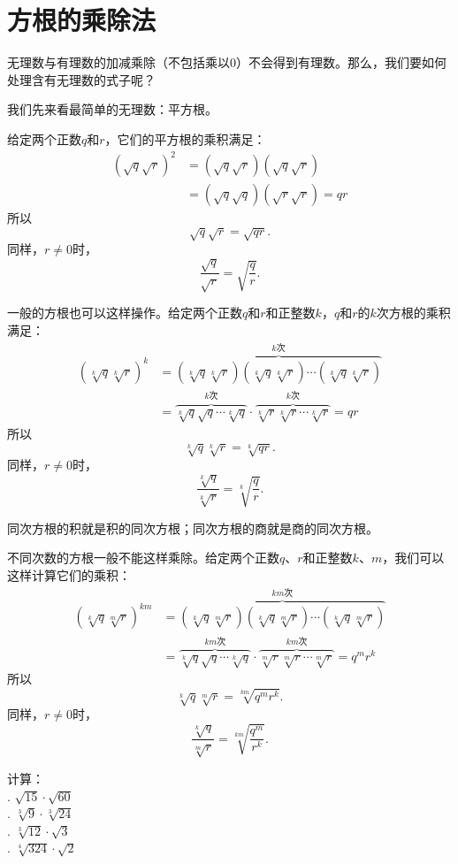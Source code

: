 \documentclass[12pt,UTF8]{ctexbook}
\begin{document}
\section{方根的乘除法}

无理数与有理数的加减乘除（不包括乘以$0$）不会得到有理数。那么，我们要如何处理含有无理数的式子呢？

我们先来看最简单的无理数：平方根。

给定两个正数$q$和$r$，它们的平方根的乘积满足：
\begin{align*}
    \left(\sqrt{q}\sqrt{r}\right)^2 &=  \left(\sqrt{q}\sqrt{r}\right)\left(\sqrt{q}\sqrt{r}\right)  \\
    &= \left(\sqrt{q}\sqrt{q}\right)\left(\sqrt{r}\sqrt{r}\right) = qr  
\end{align*}
所以
$$\sqrt{q}\sqrt{r} = \sqrt{qr}.$$
同样，$r \neq 0$时，
$$\frac{\sqrt{q}}{\sqrt{r}} = \sqrt{\frac{q}{r}}.$$

一般的方根也可以这样操作。给定两个正数$q$和$r$和正整数$k$，$q$和$r$的$k$次方根的乘积满足：
\begin{align*}
    \left(\sqrt[k]{q}\sqrt[k]{r}\right)^k &= \overbrace{\left(\sqrt[k]{q}\sqrt[k]{r}\right)\left(\sqrt[k]{q}\sqrt[k]{r}\right) \cdots \left(\sqrt[k]{q}\sqrt[k]{r}\right)}^{k\mbox{次}}   \\
    &= \overbrace{\sqrt[k]{q}\sqrt{q}\cdots \sqrt[k]{q}}^{k\mbox{次}}\cdot\overbrace{\sqrt[k]{r}\sqrt[k]{r}\cdots \sqrt[k]{r}}^{k\mbox{次}} = qr  
\end{align*}
所以
$$\sqrt[k]{q}\sqrt[k]{r} = \sqrt[k]{qr}.$$
同样，$r \neq 0$时，
$$\frac{\sqrt[k]{q}}{\sqrt[k]{r}} = \sqrt[k]{\frac{q}{r}}.$$

同次方根的积就是积的同次方根；同次方根的商就是商的同次方根。

不同次数的方根一般不能这样乘除。给定两个正数$q$、$r$和正整数$k$、$m$，我们可以这样计算它们的乘积：
\begin{align*}
    \left(\sqrt[k]{q}\sqrt[m]{r}\right)^{km} &= \overbrace{\left(\sqrt[k]{q}\sqrt[m]{r}\right)\left(\sqrt[k]{q}\sqrt[m]{r}\right) \cdots \left(\sqrt[k]{q}\sqrt[m]{r}\right)}^{km\mbox{次}}   \\
    &= \overbrace{\sqrt[k]{q}\sqrt{q}\cdots \sqrt[k]{q}}^{km\mbox{次}}\cdot\overbrace{\sqrt[m]{r}\sqrt[m]{r}\cdots \sqrt[m]{r}}^{km\mbox{次}} = q^mr^k  
\end{align*}
所以
$$\sqrt[k]{q}\sqrt[m]{r} = \sqrt[km]{q^mr^k}.$$
同样，$r \neq 0$时，
$$\frac{\sqrt[k]{q}}{\sqrt[m]{r}} = \sqrt[km]{\frac{q^m}{r^k}}.$$

\begin{et}
    计算：\\
    . $\sqrt{15}\cdot\sqrt{60}$ \\
    . $\sqrt[3]{9}\cdot\sqrt[3]{24}$ \\
    . $\sqrt[3]{12}\cdot\sqrt{3}$ \\
    . $\sqrt[4]{324}\cdot\sqrt{2}$ \\
\end{et}
\end{document}
